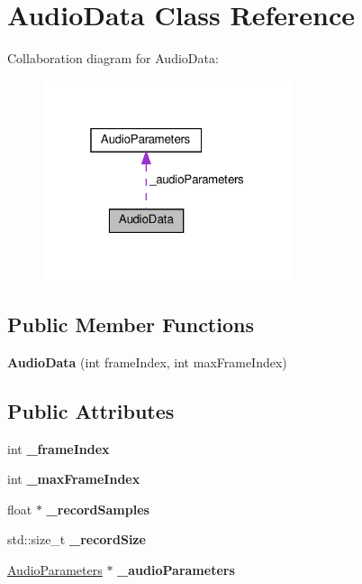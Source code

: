 \hypertarget{class_audio_data}{}\section{Audio\+Data Class Reference}
\label{class_audio_data}


Collaboration diagram for Audio\+Data\+:
\nopagebreak
\begin{figure}[H]
\begin{center}
\leavevmode
\includegraphics[width=208pt]{class_audio_data__coll__graph}
\end{center}
\end{figure}
\subsection*{Public Member Functions}
\begin{DoxyCompactItemize}
\item 
\mbox{\label{class_audio_data_a6d84c2a7e4e8097b8925d4209fdc99a0}} 
{\bfseries Audio\+Data} (int frame\+Index, int max\+Frame\+Index)
\end{DoxyCompactItemize}
\subsection*{Public Attributes}
\begin{DoxyCompactItemize}
\item 
\mbox{\label{class_audio_data_ae38d0347b7546de40aa981a8cbf48921}} 
int {\bfseries \+\_\+frame\+Index}
\item 
\mbox{\label{class_audio_data_a4fa9a944e1b94479c065467d9932f8cf}} 
int {\bfseries \+\_\+max\+Frame\+Index}
\item 
\mbox{\label{class_audio_data_a3f83072687fa7fbf8742d65546c81336}} 
float $\ast$ {\bfseries \+\_\+record\+Samples}
\item 
\mbox{\label{class_audio_data_a248d85d55007c28b6917d99610b62560}} 
std\+::size\+\_\+t {\bfseries \+\_\+record\+Size}
\item 
\mbox{\label{class_audio_data_a6d9608381036a1e5a99f1f84960eb012}} 
\hyperlink{class_audio_parameters}{Audio\+Parameters} $\ast$ {\bfseries \+\_\+audio\+Parameters}
\end{DoxyCompactItemize}



